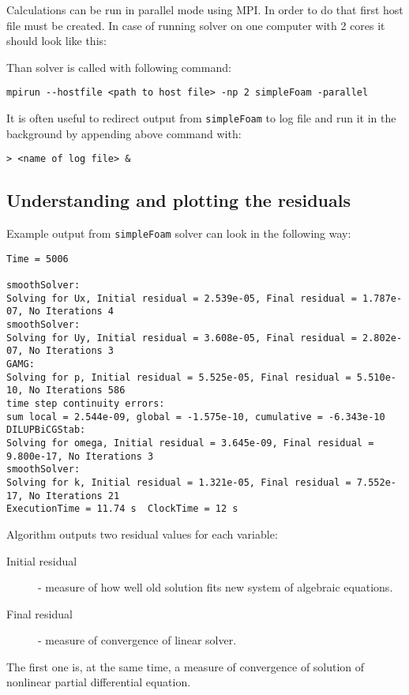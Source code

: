             Calculations can be run in parallel mode using MPI. In order to do that first host file must be created. In case of running solver on one computer with 2 cores it should look like this:
            
            Than solver is called with following command:
            \begin{lstlisting}
mpirun --hostfile <path to host file> -np 2 simpleFoam -parallel 
            \end{lstlisting}
            It is often useful to redirect output from \texttt{simpleFoam} to log file and run it in the background by appending above command with:
            \begin{lstlisting}
> <name of log file> & 
            \end{lstlisting}
        \subsection{Understanding and plotting the residuals}
            Example output from \texttt{simpleFoam} solver can look in the following way:
            \begin{lstlisting}[basicstyle=\footnotesize\ttfamily]
Time = 5006

smoothSolver:
Solving for Ux, Initial residual = 2.539e-05, Final residual = 1.787e-07, No Iterations 4
smoothSolver:  
Solving for Uy, Initial residual = 3.608e-05, Final residual = 2.802e-07, No Iterations 3
GAMG:
Solving for p, Initial residual = 5.525e-05, Final residual = 5.510e-10, No Iterations 586
time step continuity errors: 
sum local = 2.544e-09, global = -1.575e-10, cumulative = -6.343e-10
DILUPBiCGStab:
Solving for omega, Initial residual = 3.645e-09, Final residual = 9.800e-17, No Iterations 3
smoothSolver:
Solving for k, Initial residual = 1.321e-05, Final residual = 7.552e-17, No Iterations 21
ExecutionTime = 11.74 s  ClockTime = 12 s             
            \end{lstlisting}

            Algorithm outputs two residual values for each variable:
            \begin{description}
                \item[Initial residual] - measure of how well old solution fits new system of algebraic equations.
                \item[Final residual] - measure of convergence of linear solver. 
            \end{description}
            The first one is, at the same time, a measure of convergence of solution of nonlinear partial differential equation.
            
